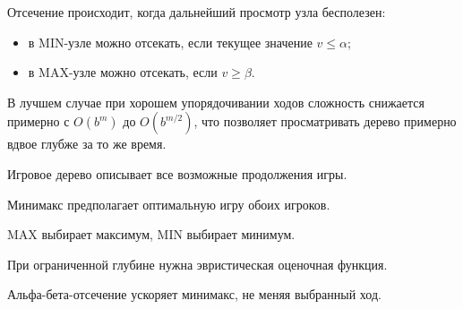 Отсечение происходит, когда дальнейший просмотр узла бесполезен:
\begin{itemize}
    \item в MIN-узле можно отсекать, если текущее значение $v\leq\alpha$;
    \item в MAX-узле можно отсекать, если $v\geq\beta$.
\end{itemize}

В лучшем случае при хорошем упорядочивании ходов сложность снижается примерно с $O(b^m)$ до $O(b^{m/2})$, что позволяет просматривать дерево примерно вдвое глубже за то же время.

\begin{important}
    \item Игровое дерево описывает все возможные продолжения игры.
    \item Минимакс предполагает оптимальную игру обоих игроков.
    \item MAX выбирает максимум, MIN выбирает минимум.
    \item При ограниченной глубине нужна эвристическая оценочная функция.
    \item Альфа-бета-отсечение ускоряет минимакс, не меняя выбранный ход.
\end{important}
